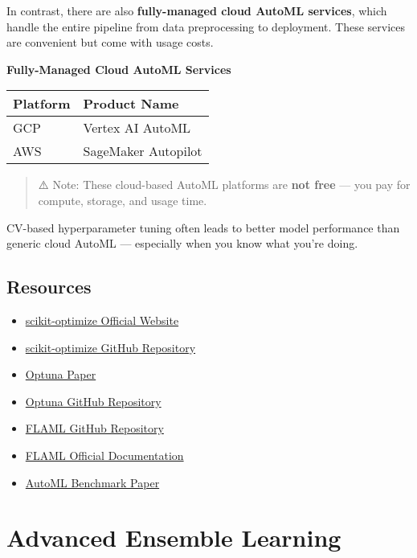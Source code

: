 \documentclass[
  letterpaper,
  DIV=11,
  numbers=noendperiod]{scrreprt}
\providecommand{\tightlist}{%
  \setlength{\itemsep}{0pt}\setlength{\parskip}{0pt}}\usepackage{longtable,booktabs,array}
\begin{document}
In contrast, there are also \textbf{fully-managed cloud AutoML
services}, which handle the entire pipeline from data preprocessing to
deployment. These services are convenient but come with usage costs.

\textbf{Fully-Managed Cloud AutoML Services}

\begin{longtable}[]{@{}ll@{}}
\toprule\noalign{}
\textbf{Platform} & \textbf{Product Name} \\
\midrule\noalign{}
\endhead
\bottomrule\noalign{}
\endlastfoot
GCP & Vertex AI AutoML \\
AWS & SageMaker Autopilot \\
\end{longtable}

\begin{quote}
⚠️ Note: These cloud-based AutoML platforms are \textbf{not free} ---
you pay for compute, storage, and usage time.
\end{quote}

CV-based hyperparameter tuning often leads to better model performance
than generic cloud AutoML --- especially when you know what you're
doing.

\section{Resources}\label{resources}

\begin{itemize}
\tightlist
\item
  \href{https://scikit-optimize.github.io/}{scikit-optimize Official
  Website}
\item
  \href{https://github.com/scikit-optimize/scikit-optimize}{scikit-optimize
  GitHub Repository}
\item
  \href{https://arxiv.org/abs/1907.10902}{Optuna Paper}
\item
  \href{https://github.com/optuna/optuna}{Optuna GitHub Repository}
\item
  \href{https://github.com/microsoft/FLAML}{FLAML GitHub Repository}
\item
  \href{https://microsoft.github.io/FLAML/}{FLAML Official
  Documentation}
\item
  \href{https://arxiv.org/abs/2009.05399}{AutoML Benchmark Paper}
\end{itemize}

\chapter{Advanced Ensemble Learning}\label{advanced-ensemble-learning}
\end{document}
